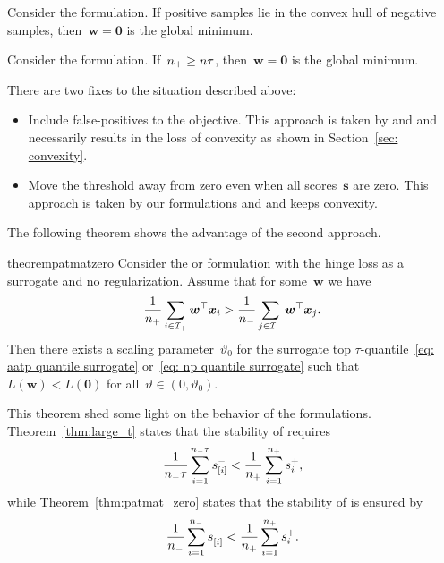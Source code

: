 \begin{corollary}\label{cor:toppush}
  Consider the \TopPush formulation. If positive samples lie in the convex hull of negative samples, then~$\bm{w}=\bm{0}$ is the global minimum.
\end{corollary}

\begin{corollary}\label{cor:topmean}
  Consider the \TopMeanK formulation. If~$n_{+}\geq n\tau$, then~$\bm{w}=\bm{0}$ is the global minimum.
\end{corollary}

There are two fixes to the situation described above:
\begin{itemize}
  \item Include false-positives to the objective. This approach is taken by \Grill and \GrillNP and necessarily results in the loss of convexity as shown in Section~\ref{sec: convexity}.
  \item Move the threshold away from zero even when all scores~$\bm{s}$ are zero. This approach is taken by our formulations \PatMat and \PatMatNP and keeps convexity.
\end{itemize}
The following theorem shows the advantage of the second approach.

\begin{restatable}{theorem}{patmatzero}\label{thm:patmat_zero}
  Consider the \PatMat or \PatMatNP formulation with the hinge loss as a surrogate and no regularization. Assume that for some~$\bm{w}$ we have
  \begin{equation}\label{eq:patmat_zero}
    \frac{1}{n_{+}}\sum_{i \in \mathcal{I}_{+}}\bm{w}^{\top} \bm{x}_i > \frac{1}{n_{-}}\sum_{j \in \mathcal{I}_{-}}\bm{w}^{\top} \bm{x}_j.
  \end{equation}
  Then there exists a scaling parameter~$\vartheta_0$ for the surrogate top $\tau$-quantile~\eqref{eq: aatp quantile surrogate} or~\eqref{eq: np quantile surrogate} such that~$L(\bm{w}) < L(\bm{0})$ for all~$\vartheta \in (0, \vartheta_0)$.
\end{restatable}

This theorem shed some light on the behavior of the formulations. Theorem~\ref{thm:large_t} states that the stability of \tauFPL requires
\begin{equation}\label{eq:stability1}
  \frac{1}{n_{-}\tau}\sum_{i=1}^{n_{-}\tau}s_{[i]}^- < \frac{1}{n_{+}}\sum_{i=1}^{n_{+}} s_{i}^+,
\end{equation}
while Theorem~\ref{thm:patmat_zero} states that the stability of \PatMatNP is ensured by
\begin{equation}\label{eq:stability2}
  \frac{1}{n_{-}}\sum_{i=1}^{n_{-}}s_{[i]}^- < \frac{1}{n_{+}}\sum_{i=1}^{n_{+}} s_{i}^+.
\end{equation}


